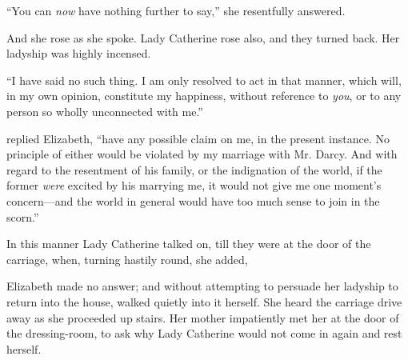 “You can {\em now} have nothing further to say,” she resentfully answered. 

And she rose as she spoke. Lady Catherine rose also, and they turned back. Her ladyship was highly incensed.




“I have said no such thing. I am only resolved to act in that manner, which will, in my own opinion, constitute my happiness, without reference to {\em you}, or to any person so wholly unconnected with me.”


 replied Elizabeth, “have any possible claim on me, in the present instance. No principle of either would be violated by my marriage with Mr. Darcy. And with regard to the resentment of his family, or the indignation of the world, if the former {\em were} excited by his marrying me, it would not give me one moment's concern---and the world in general would have too much sense to join in the scorn.”


In this manner Lady Catherine talked on, till they were at the door of the carriage, when, turning hastily round, she added, 

Elizabeth made no answer; and without attempting to persuade her ladyship to return into the house, walked quietly into it herself. She heard the carriage drive away as she proceeded up stairs. Her mother impatiently met her at the door of the dressing-room, to ask why Lady Catherine would not come in again and rest herself.

